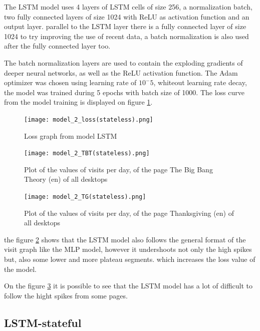 The LSTM model uses 4 layers of LSTM cells of size 256, a normalization batch,
two fully connected layers of size 1024 with ReLU as activation function and an output layer.
parallel to the LSTM layer there is a fully connected layer of size 1024 to try improving the use of recent data,
a batch normalization is also used after the fully connected layer too.

The batch normalization layers are used to contain the exploding gradients of deeper neural networks,
as well as the ReLU activation function. The Adam optimizer was chosen using learning rate of $10^-5$,
whiteout learning rate decay, the model was trained during 5 epochs with batch size of 1000.
The loss curve from the model training is displayed on figure \ref{fig:model_2_loss}.

\begin{figure}
	\centering
	\texttt{[image: model\_2\_loss(stateless).png]}
	\caption{Loss graph from model LSTM\label{fig:model_2_loss}}
\end{figure}

\begin{figure}
	\centering
	\texttt{[image: model\_2\_TBT(stateless).png]}
	\caption{Plot of the values of visits per day, of the page The Big Bang Theory (en) of all desktops\label{fig:model_2_TBT}}
\end{figure}

\begin{figure}
	\centering
	\texttt{[image: model\_2\_TG(stateless).png]}
	\caption{Plot of the values of visits per day, of the page Thanksgiving (en) of all desktops\label{fig:model_2_TG}}
\end{figure}

the figure \ref{fig:model_2_TBT} shows that the LSTM model also follows the general format of the visit graph like the MLP model, however it undershoots not only the high spikes but, also some lower and more plateau segments.
which increases the loss value of the model.

On the figure \ref{fig:model_2_TG} it is possible to see that the LSTM model has a lot of difficult to follow the hight spikes from some pages.

\subsection{LSTM-stateful}
